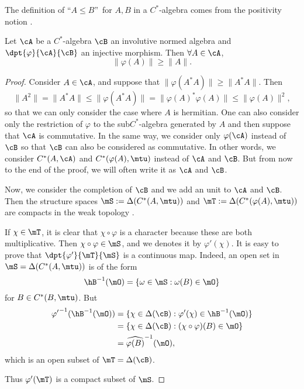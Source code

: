 The definition of ``$A\leq B$''\ for $A,B$ in a $C^{*}$-algebra comes from the positivity notion .

\begin{proposition}
Let $\cA$ be a $C^{*}$-algebra $\cB$ an involutive normed algebra and $\dpt{\varphi}{\cA}{\cB}$ an injective morphism. Then $\forall A\in\cA$,
\[
   \|\varphi(A)\|\geq\|A\|.
\]\label{prop:vp_geq}
\end{proposition}

\begin{proof}
Consider $A\in\cA$, and suppose that $\|\varphi(A^*A)\|\geq\|A^*A\|$. Then
\[
\|A^2\|=\|A^*A\|\leq\|\varphi(A^*A)\|=\|\varphi(A)^*\varphi(A)\|\leq\|\varphi(A)\|^2,
\]
so that we can only consider the case where $A$ is hermitian. One can also consider only the restriction of $\varphi$ to the sub$C^{*}$-algebra generated by $A$ and then suppose that $\cA$ is commutative. In the same way, we consider only $\varphi(\cA)$ instead of $\cB$ so that $\cB$ can also be considered as commutative. In other words, we consider $C^*(A,\cA)$ and $C^*(\varphi(A),\mtu)$ instead of $\cA$ and $\cB$. But from now to the end of the proof, we will often write it as $\cA$ and $\cB$.

Now, we consider the completion of $\cB$ and we add an unit to $\cA$ and $\cB$. Then the structure spaces $\mS:=\Delta(C^*(A,\mtu))$ and $\mT:=\Delta(C^*(\varphi(A),\mtu))$ are compacts in the weak topology .

If $\chi\in\mT$, it is clear that $\chi\circ\varphi$ is a character because these are both multiplicative. Then $\chi\circ\varphi\in\mS$, and we denotes it by $\varphi'(\chi)$. It is easy to prove that $\dpt{\varphi'}{\mT}{\mS}$ is a continuous map. Indeed, an open set in $\mS=\Delta(C^*(A,\mtu))$ is of the form
\[
  \hB^{-1}(\mO)=\{ \omega\in\mS:\omega(B)\in\mO  \}
\]
 for $B\in C^*(B,\mtu)$. But
 \begin{equation}
\begin{split}
   {\varphi'}^{-1}(\hB^{-1}(\mO))&=\{ \chi\in\Delta(\cB):\varphi'(\chi)\in\hB^{-1}(\mO)  \}\\
                         &=\{ \chi\in\Delta(\cB): (\chi\circ\varphi)(B)\in\mO  \} \\
             &=\widehat{\varphi(B)}^{-1}(\mO),
\end{split}
\end{equation}
which is an open subset of $\mT=\Delta(\cB)$.
 
 Thus $\varphi'(\mT)$ is a compact subset of $\mS$.


\end{proof}
